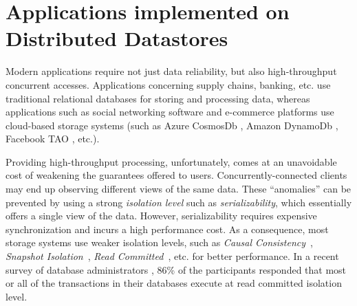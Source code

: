 
\section{Applications implemented on Distributed Datastores}

Modern applications require not just data
reliability, but also high-throughput concurrent accesses. 
Applications concerning supply chains, banking, etc. use traditional relational databases
for storing and processing data, whereas applications such as social networking
software and e-commerce platforms 
use cloud-based storage systems (such as Azure CosmosDb \cite{cosmosdb}, Amazon DynamoDb
\cite{DBLP:conf/sosp/DeCandiaHJKLPSVV07}, Facebook TAO \cite{DBLP:conf/usenix/BronsonACCDDFGKLMPPSV13}, etc.).


 

Providing high-throughput processing, unfortunately, comes at an unavoidable cost of weakening 
the guarantees offered to users.
Concurrently-connected clients may end up observing different views of the same data. 
These ``anomalies'' can be prevented by using a strong \textit{isolation level} 
such as \textit{serializability}, which essentially offers a single view of the
data. However, serializability requires expensive synchronization and incurs a high performance cost. As a
consequence, most storage systems use weaker isolation levels, such as 
{\it Causal Consistency}~\cite{DBLP:journals/cacm/Lamport78,DBLP:conf/sosp/LloydFKA11,antidote-white-paper},
{\it Snapshot Isolation}~\cite{DBLP:conf/sigmod/BerensonBGMOO95}, {\it Read
Committed}~\cite{DBLP:conf/sigmod/BerensonBGMOO95}, etc. for better performance.
In a recent survey of
database administrators \cite{DBLP:conf/sigmod/Pavlo17}, 86\% of the participants responded that
most or all of the transactions in their databases execute at read committed isolation level.

